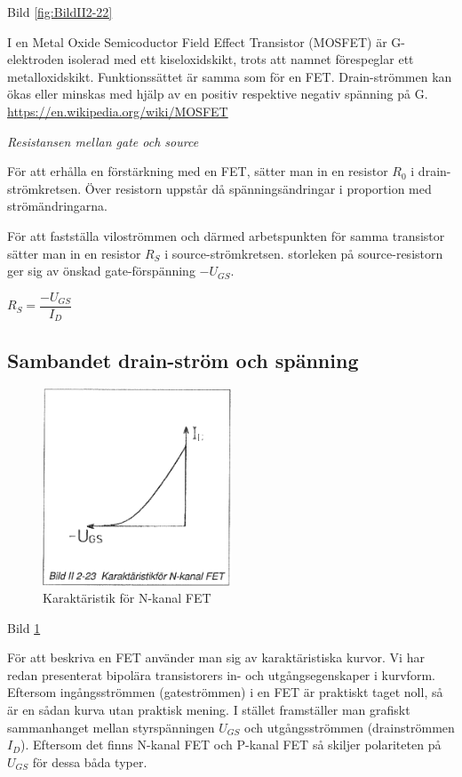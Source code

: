 Bild \ref{fig:BildII2-22}


I en Metal Oxide Semicoductor Field Effect Transistor (MOSFET) är
G-elektroden isolerad med ett kiseloxidskikt, trots att namnet förespeglar
ett metalloxidskikt. Funktionssättet är samma som för en FET.
Drain-strömmen kan ökas eller minskas med hjälp av en
positiv respektive negativ spänning på G.
\url{https://en.wikipedia.org/wiki/MOSFET}

\emph{Resistansen mellan gate och source}

För att erhålla en förstärkning med en FET, sätter man in en resistor
\(R_0\) i drain-strömkretsen. Över resistorn uppstår då spänningsändringar i
proportion med strömändringarna.

För att fastställa viloströmmen och därmed arbetspunkten för samma transistor
sätter man in en resistor \(R_S\) i source-strömkretsen. storleken på
source-resistorn ger sig av önskad gate-förspänning \(-U_{GS}\).

\(R_S = \dfrac{-U_{GS}}{I_D}\)

\subsection{Sambandet drain-ström och spänning}

\begin{figure}
\includegraphics[width=0.5\textwidth]{images/bild_2_2-23}
\caption{Karaktäristik för N-kanal FET}
\label{fig:BildII2-23}
\end{figure}

Bild \ref{fig:BildII2-23}

För att beskriva en FET använder man sig av karaktäristiska kurvor. Vi har redan
presenterat bipolära transistorers in- och utgångsegenskaper i kurvform.
Eftersom ingångsströmmen (gateströmmen) i en FET är praktiskt taget noll, så är
en sådan kurva utan praktisk mening. I stället framställer man grafiskt
sammanhanget mellan styrspänningen \(U_{GS}\) och utgångsströmmen (drainströmmen
\(I_D\)). Eftersom det finns N-kanal FET och P-kanal FET så skiljer polariteten
på \(U_{GS}\) för dessa båda typer.
